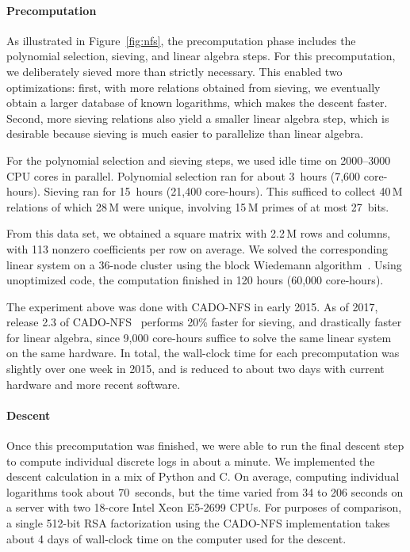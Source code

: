 \paragraph{Precomputation}
As illustrated in Figure~\ref{fig:nfs}, the precomputation phase includes
the polynomial selection, sieving, and linear algebra steps. For this
precomputation, we deliberately sieved more than strictly necessary.
This enabled two optimizations: first, with more relations obtained
from sieving, we eventually obtain a larger database of known logarithms,
which makes the descent faster. Second, more sieving relations also
yield a smaller linear algebra step, which is desirable because
sieving is much easier to parallelize than linear
algebra.

For the polynomial selection and sieving steps, we used idle time on
2000--3000 CPU cores in parallel.
Polynomial selection ran for
about 3~hours (7,600
core-hours). Sieving ran for 15~hours (21,400
core-hours). This sufficed to collect 40\,M relations of which
28\,M were unique, involving 15\,M primes of at
most 27~bits.

From this data set, we obtained a square matrix with 2.2\,M rows
and columns, with 113 nonzero coefficients per row on average. We
solved the corresponding linear system on a 36-node cluster using the block Wiedemann
algorithm~\cite{Coppersmith94,Thome02b}. Using unoptimized code, 
the computation finished in
120 hours (60,000 core-hours).

The experiment above was done with CADO-NFS
in early 2015. As of 2017, release 2.3 of
CADO-NFS~\cite{cado-nfs-2.3} performs 20\% faster for sieving,
and drastically faster for linear algebra, since 9,000
core-hours suffice to solve the same linear system on the same hardware.
In total, the wall-clock time for each precomputation was slightly
over one week in 2015, and is reduced to about two days with current
hardware and more recent software.

\paragraph{Descent}
Once this precomputation was finished, we were able to run the final
descent step to compute individual discrete logs in about a minute. We implemented the descent calculation in a mix of Python and C\@. On average, computing individual logarithms took about 70~seconds,
but the time varied from 34 to 206 seconds on a server with two 18-core Intel Xeon E5-2699 CPUs. For purposes of comparison, a single 512-bit RSA factorization using
the CADO-NFS implementation takes about 4 days of wall-clock
time on the computer used for the descent\cite{cado-nfs-2.3}.

